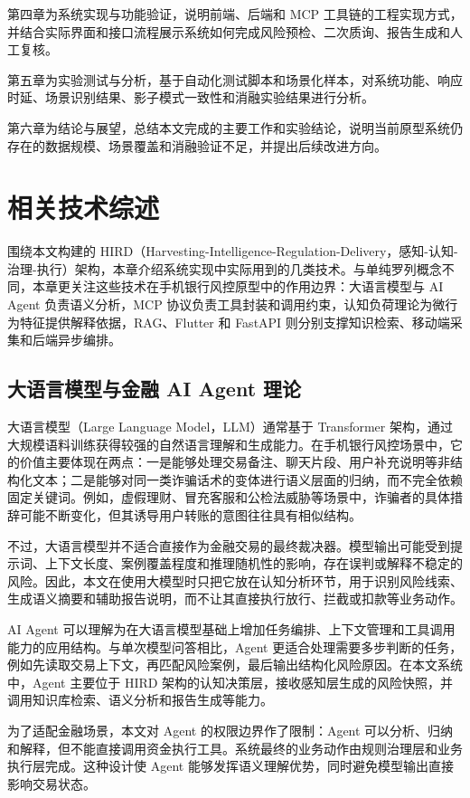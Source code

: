 \documentclass{xduugthesis}
\begin{document}
第四章为系统实现与功能验证，说明前端、后端和 MCP 工具链的工程实现方式，并结合实际界面和接口流程展示系统如何完成风险预检、二次质询、报告生成和人工复核\cite{pressman2019software}。

第五章为实验测试与分析，基于自动化测试脚本和场景化样本，对系统功能、响应时延、场景识别结果、影子模式一致性和消融实验结果进行分析。

第六章为结论与展望，总结本文完成的主要工作和实验结论，说明当前原型系统仍存在的数据规模、场景覆盖和消融验证不足，并提出后续改进方向。


\chapter{相关技术综述}
围绕本文构建的 HIRD（Harvesting-Intelligence-Regulation-Delivery，感知-认知-治理-执行）架构，本章介绍系统实现中实际用到的几类技术。与单纯罗列概念不同，本章更关注这些技术在手机银行风控原型中的作用边界：大语言模型与 AI Agent 负责语义分析，MCP 协议负责工具封装和调用约束，认知负荷理论为微行为特征提供解释依据，RAG、Flutter 和 FastAPI 则分别支撑知识检索、移动端采集和后端异步编排。

\section{大语言模型与金融 AI Agent 理论}
大语言模型（Large Language Model，LLM）通常基于 Transformer 架构，通过大规模语料训练获得较强的自然语言理解和生成能力\cite{nicolaou2025llm}。在手机银行风控场景中，它的价值主要体现在两点：一是能够处理交易备注、聊天片段、用户补充说明等非结构化文本；二是能够对同一类诈骗话术的变体进行语义层面的归纳，而不完全依赖固定关键词。例如，虚假理财、冒充客服和公检法威胁等场景中，诈骗者的具体措辞可能不断变化，但其诱导用户转账的意图往往具有相似结构\cite{wang2025fraud}。

不过，大语言模型并不适合直接作为金融交易的最终裁决器。模型输出可能受到提示词、上下文长度、案例覆盖程度和推理随机性的影响，存在误判或解释不稳定的风险。因此，本文在使用大模型时只把它放在认知分析环节，用于识别风险线索、生成语义摘要和辅助报告说明，而不让其直接执行放行、拦截或扣款等业务动作。

AI Agent 可以理解为在大语言模型基础上增加任务编排、上下文管理和工具调用能力的应用结构\cite{zangana2025llm}。与单次模型问答相比，Agent 更适合处理需要多步判断的任务，例如先读取交易上下文，再匹配风险案例，最后输出结构化风险原因。在本文系统中，Agent 主要位于 HIRD 架构的认知决策层，接收感知层生成的风险快照，并调用知识库检索、语义分析和报告生成等能力。

为了适配金融场景，本文对 Agent 的权限边界作了限制：Agent 可以分析、归纳和解释，但不能直接调用资金执行工具。系统最终的业务动作由规则治理层和业务执行层完成。这种设计使 Agent 能够发挥语义理解优势，同时避免模型输出直接影响交易状态。
\end{document}
